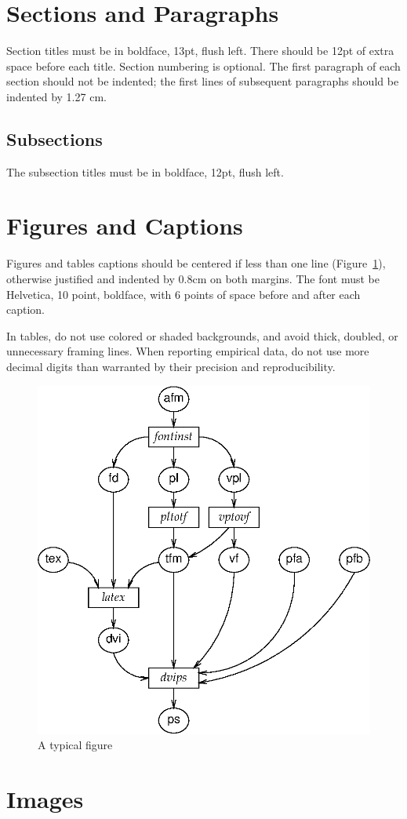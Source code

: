 \documentclass[12pt]{article}
\begin{document}
\section{Sections and Paragraphs}
Section titles must be in boldface, 13pt, flush left. There should be
12pt of extra space before each title. Section numbering is
optional. The first paragraph of each section should not be indented;
the first lines of subsequent paragraphs should be indented by 1.27
cm.

\subsection{Subsections}

The subsection titles must be in boldface, 12pt, flush left.

\section{Figures and Captions}

Figures and tables captions should be centered if less than one line
(Figure~\ref{fig:exampleFig}), otherwise justified and indented by
0.8cm on both margins. The font must be Helvetica, 10 point, boldface,
with 6 points of space before and after each caption.

In tables, do not use colored or shaded backgrounds, and avoid thick,
doubled, or unnecessary framing lines. When reporting empirical data,
do not use more decimal digits than warranted by their precision and
reproducibility.


\begin{figure}
\centering
\includegraphics[width=.5\textwidth]{exampleFig.eps}
\caption{A typical figure}
\label{fig:exampleFig}
\end{figure}


\section{Images}
\end{document}
